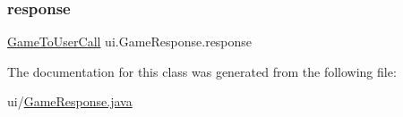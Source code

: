 \subsubsection{\texorpdfstring{response}{response}}
{\footnotesize\ttfamily \mbox{\hyperlink{enumui_1_1commands_1_1_game_to_user_call}{Game\+To\+User\+Call}} ui.\+Game\+Response.\+response\hspace{0.3cm}{\ttfamily [private]}}



The documentation for this class was generated from the following file\+:\begin{DoxyCompactItemize}
\item 
ui/\mbox{\hyperlink{_game_response_8java}{Game\+Response.\+java}}\end{DoxyCompactItemize}
